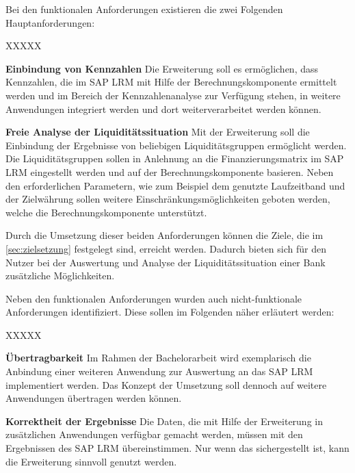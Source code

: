 \begin{onehalfspacing}
Bei den funktionalen Anforderungen existieren die zwei Folgenden Hauptanforderungen:

\begin{seToplist}{ XXXXX }

\item[\anfl{kpi}] \textbf{Einbindung von Kennzahlen} \newline
Die Erweiterung soll es ermöglichen, dass Kennzahlen, die im SAP LRM  mit Hilfe der Berechnungskomponente ermittelt werden und im Bereich der Kennzahlenanalyse zur Verfügung stehen, in weitere Anwendungen integriert werden und dort weiterverarbeitet werden können.

\item[\anfl{fundingMatrix}] \textbf{Freie Analyse der Liquiditätssituation} \newline
Mit der Erweiterung soll die Einbindung der Ergebnisse von beliebigen Liquiditätsgruppen ermöglicht werden. Die Liquiditätsgruppen sollen in Anlehnung an die Finanzierungsmatrix im SAP LRM eingestellt werden und auf der Berechnungskomponente basieren. Neben den erforderlichen Parametern, wie zum Beispiel dem genutzte Laufzeitband und der Zielwährung sollen weitere Einschränkungsmöglichkeiten geboten werden, welche die Berechnungskomponente unterstützt.

\end{seToplist}

Durch die Umsetzung dieser beiden  Anforderungen können die Ziele, die im \vref{sec:zielsetzung} festgelegt sind, erreicht werden. Dadurch bieten sich für den Nutzer bei der Auswertung und Analyse der Liquiditätssituation einer Bank zusätzliche Möglichkeiten.

Neben den funktionalen Anforderungen wurden auch nicht-funktionale Anforderungen identifiziert. Diese sollen im Folgenden näher erläutert werden:

\begin{seToplist}{ XXXXX }

\item[\anfl{uebertragbarkeit}] \textbf{Übertragbarkeit} \newline
Im Rahmen der Bachelorarbeit wird exemplarisch die Anbindung einer weiteren Anwendung zur Auswertung an das SAP LRM implementiert werden. Das Konzept der Umsetzung soll dennoch auf weitere Anwendungen übertragen werden können.

\item[\anfl{korrektheit}] \textbf{Korrektheit der Ergebnisse} \newline
Die Daten, die mit Hilfe der Erweiterung in zusätzlichen Anwendungen verfügbar gemacht werden, müssen mit den Ergebnissen des SAP LRM übereinstimmen. Nur wenn das sichergestellt ist, kann die Erweiterung sinnvoll genutzt werden.


\end{seToplist}
\end{onehalfspacing}
